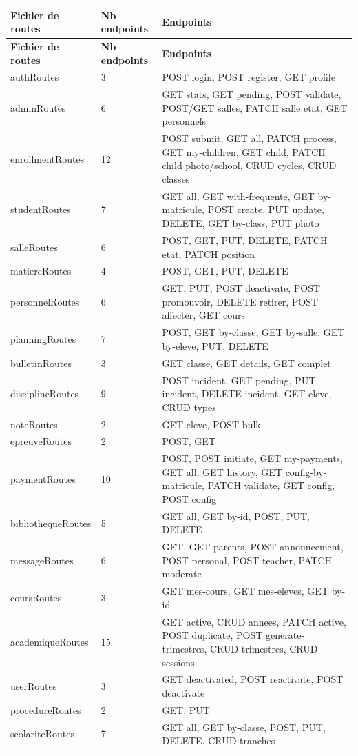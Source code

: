 \documentclass[12pt,a4paper]{report}
\begin{document}
\begin{longtable}{|p{3.5cm}|p{2cm}|p{9cm}|}
\hline
\textbf{Fichier de routes} & \textbf{Nb endpoints} & \textbf{Endpoints} \\
\hline
\endfirsthead
\hline
\textbf{Fichier de routes} & \textbf{Nb endpoints} & \textbf{Endpoints} \\
\hline
\endhead
authRoutes & 3 & POST login, POST register, GET profile \\
\hline
adminRoutes & 6 & GET stats, GET pending, POST validate, POST/GET salles, PATCH salle etat, GET personnels \\
\hline
enrollmentRoutes & 12 & POST submit, GET all, PATCH process, GET my-children, GET child, PATCH child photo/school, CRUD cycles, CRUD classes \\
\hline
studentRoutes & 7 & GET all, GET with-frequente, GET by-matricule, POST create, PUT update, DELETE, GET by-class, PUT photo \\
\hline
salleRoutes & 6 & POST, GET, PUT, DELETE, PATCH etat, PATCH position \\
\hline
matiereRoutes & 4 & POST, GET, PUT, DELETE \\
\hline
personnelRoutes & 6 & GET, PUT, POST deactivate, POST promouvoir, DELETE retirer, POST affecter, GET cours \\
\hline
planningRoutes & 7 & POST, GET by-classe, GET by-salle, GET by-eleve, PUT, DELETE \\
\hline
bulletinRoutes & 3 & GET classe, GET details, GET complet \\
\hline
disciplineRoutes & 9 & POST incident, GET pending, PUT incident, DELETE incident, GET eleve, CRUD types \\
\hline
noteRoutes & 2 & GET eleve, POST bulk \\
\hline
epreuveRoutes & 2 & POST, GET \\
\hline
paymentRoutes & 10 & POST, POST initiate, GET my-payments, GET all, GET history, GET config-by-matricule, PATCH validate, GET config, POST config \\
\hline
bibliothequeRoutes & 5 & GET all, GET by-id, POST, PUT, DELETE \\
\hline
messageRoutes & 6 & GET, GET parents, POST announcement, POST personal, POST teacher, PATCH moderate \\
\hline
coursRoutes & 3 & GET mes-cours, GET mes-eleves, GET by-id \\
\hline
academiqueRoutes & 15 & GET active, CRUD annees, PATCH active, POST duplicate, POST generate-trimestres, CRUD trimestres, CRUD sessions \\
\hline
userRoutes & 3 & GET deactivated, POST reactivate, POST deactivate \\
\hline
procedureRoutes & 2 & GET, PUT \\
\hline
scolariteRoutes & 7 & GET all, GET by-classe, POST, PUT, DELETE, CRUD tranches \\
\hline
\end{longtable}
 
\end{document}
